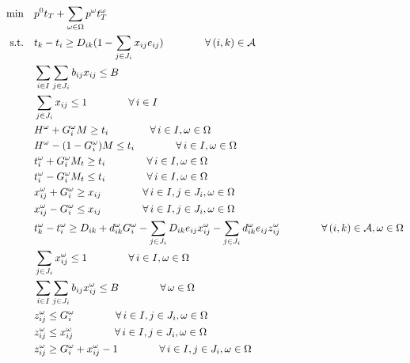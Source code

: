 \documentclass[11pt]{article}
\newcommand{\cA}{{\cal A}}
\begin{document}
	\begin{subequations} \label{prob:extensive}
		\begin{align}
		\min \quad & p^0 t_T + \sum_{\omega \in \Omega} p^\omega t_T^\omega \\
		\text{s.t.} \quad & t_k - t_i \geq D_{ik}(1 - \sum_{j \in J_i} x_{ij} e_{ij}) \qquad \qquad \forall \, (i,k) \in \mathcal{A} \label{cons:Sep}\\
		& \sum_{i \in I} \sum_{j \in J_i} b_{ij}x_{ij} \leq B  \label{cons:Budget}\\
		& \sum_{j \in J_i} x_{ij} \leq 1  \qquad \qquad \forall \,i \in I \label{cons:SingleBudget}\\
		& H^\omega + G_i^\omega M \geq t_i \qquad \qquad \forall \,i \in I, \omega \in \Omega \label{cons:G1}\\
		& H^\omega - (1 - G_i^\omega) M \leq t_i \qquad \qquad \forall \,i \in I, \omega \in \Omega \label{cons:G2}\\
		& t_i^\omega + G_i^\omega M_t \geq t_i \qquad \qquad \forall \,i \in I, \omega \in \Omega \label{cons:tG1}\\
		& t_i^\omega - G_i^\omega M_t \leq t_i \qquad \qquad \forall \,i \in I, \omega \in \Omega \label{cons:tG2}\\
		& x_{ij}^\omega + G_i^\omega \geq x_{ij} \qquad \qquad \forall \,i \in I, j \in J_i, \omega \in \Omega \label{cons:xG1}\\
		& x_{ij}^\omega - G_i^\omega \leq x_{ij} \qquad \qquad \forall \,i \in I, j \in J_i, \omega \in \Omega \label{cons:xG2}\\
		& t_k^\omega - t_i^\omega \geq D_{ik} + d_{ik}^\omega G_i^\omega -\sum_{j \in J_i} D_{ik} e_{ij} x_{ij}^\omega - \sum_{j \in J_i} d_{ik}^\omega e_{ij} z_{ij}^\omega \qquad \qquad \forall \,(i,k) \in \cA, \omega \in \Omega \label{cons:scenSep}\\
		& \sum_{j \in J_i} x_{ij}^\omega \leq 1 \qquad \qquad \forall \,i \in I, \omega \in \Omega \label{cons:scenBudget1}\\
		& \sum_{i \in I}\sum_{j \in J_i} b_{ij}x_{ij}^\omega \leq B \qquad \qquad \forall \,\omega \in \Omega \label{cons:scenBudget}\\
		& z_{ij}^\omega \leq G_i^\omega \qquad \qquad \forall \,i \in I, j \in J_i, \omega \in \Omega \label{cons:linearize1}\\
		& z_{ij}^\omega \leq x_{ij}^\omega \qquad \qquad \forall \,i \in I, j \in J_i, \omega \in \Omega \label{cons:linearize2}\\
		& z_{ij}^\omega \geq G_i^\omega + x_{ij}^\omega - 1 \qquad \qquad \forall \,i \in I, j \in J_i, \omega \in \Omega \label{cons:linearize3}\\

\end{align}
\end{subequations}
\end{document}
